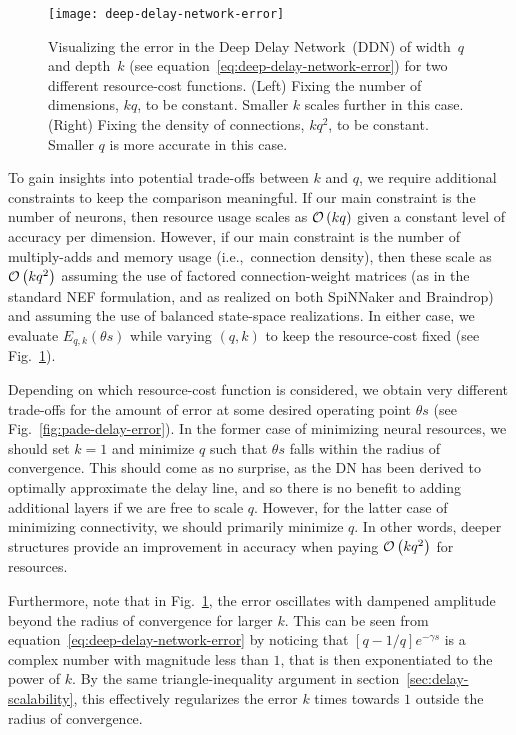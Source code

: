 \begin{figure}
  \centering
  \texttt{[image: deep-delay-network-error]}
  \caption{\label{fig:deep-delay-network-error}
    Visualizing the error in the Deep Delay Network~(DDN) of width~$q$ and depth~$k$ (see equation~\ref{eq:deep-delay-network-error}) for two different resource-cost functions.
    (Left) Fixing the number of dimensions, $kq$, to be constant.
    Smaller $k$ scales further in this case.
    (Right) Fixing the density of connections, $kq^2$, to be constant.
    Smaller $q$ is more accurate in this case.
  }
\end{figure}

To gain insights into potential trade-offs between $k$ and $q$, we require additional constraints to keep the comparison meaningful.
If our main constraint is the number of neurons, then resource usage scales as $\mathcal{O}\left({k q}\right)$ given a constant level of accuracy per dimension.
However, if our main constraint is the number of multiply-adds and memory usage (i.e.,~connection density), then these scale as $\mathcal{O}\left({k q^2}\right)$ assuming the use of factored connection-weight matrices (as in the standard NEF formulation, and as realized on both SpiNNaker and Braindrop) and assuming the use of balanced state-space realizations.
In either case, we evaluate $E_{q,k}(\theta s)$ while varying $(q, k)$ to keep the resource-cost fixed (see Fig.~\ref{fig:deep-delay-network-error}).

Depending on which resource-cost function is considered, we obtain very different trade-offs for the amount of error at some desired operating point $\theta s$ (see Fig.~\ref{fig:pade-delay-error}).
In the former case of minimizing neural resources, we should set $k = 1$ and minimize $q$ such that $\theta s$ falls within the radius of convergence.
This should come as no surprise, as the DN has been derived to optimally approximate the delay line, and so there is no benefit to adding additional layers if we are free to scale $q$.
However, for the latter case of minimizing connectivity, we should primarily minimize $q$.
In other words, deeper structures provide an improvement in accuracy when paying $\mathcal{O}\left({kq^2}\right)$ for resources.

Furthermore, note that in Fig.~\ref{fig:deep-delay-network-error}, the error oscillates with dampened amplitude beyond the radius of convergence for larger $k$.
This can be seen from equation~\ref{eq:deep-delay-network-error} by noticing that $[q-1/q]e^{-\gamma s}$ is a complex number with magnitude less than $1$, that is then exponentiated to the power of $k$.
By the same triangle-inequality argument in section~\ref{sec:delay-scalability}, this effectively regularizes the error $k$ times towards $1$ outside the radius of convergence.

